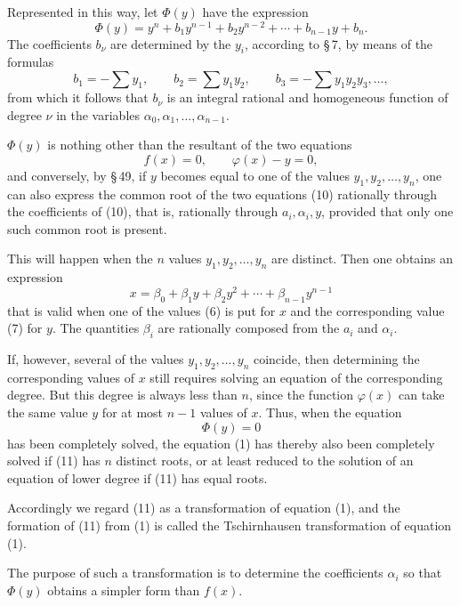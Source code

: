 \documentclass[11pt]{article}
\begin{document}
Represented in this way, let $\Phi(y)$ have the expression
\begin{equation}
\Phi(y)=y^n+b_1y^{n-1}+b_2y^{n-2}+\cdots+b_{n-1}y+b_n.
\tag{9}
\end{equation}
The coefficients $b_\nu$ are determined by the $y_i$, according to \S\,7, by means of the formulas
\[
b_1=-\sum y_1,
\qquad
b_2=\sum y_1y_2,
\qquad
b_3=-\sum y_1y_2y_3,\ldots,
\]
from which it follows that $b_\nu$ is an integral rational and homogeneous function of degree $\nu$ in the variables $\alpha_0,\alpha_1,\ldots,\alpha_{n-1}$.

$\Phi(y)$ is nothing other than the resultant of the two equations
\begin{equation}
f(x)=0,
\qquad
\varphi(x)-y=0,
\tag{10}
\end{equation}
and conversely, by \S\,49, if $y$ becomes equal to one of the values $y_1,y_2,\ldots,y_n$, one can also express the common root of the two equations (10) rationally through the coefficients of (10), that is, rationally through $a_i,\alpha_i,y$, provided that only one such common root is present.

This will happen when the $n$ values $y_1,y_2,\ldots,y_n$ are distinct. Then one obtains an expression
\[
x=\beta_0+\beta_1y+\beta_2y^2+\cdots+\beta_{n-1}y^{n-1}
\]
that is valid when one of the values (6) is put for $x$ and the corresponding value (7) for $y$. The quantities $\beta_i$ are rationally composed from the $a_i$ and $\alpha_i$.

If, however, several of the values $y_1,y_2,\ldots,y_n$ coincide, then determining the corresponding values of $x$ still requires solving an equation of the corresponding degree. But this degree is always less than $n$, since the function $\varphi(x)$ can take the same value $y$ for at most $n-1$ values of $x$. Thus, when the equation
\begin{equation}
\Phi(y)=0
\tag{11}
\end{equation}
has been completely solved, the equation (1) has thereby also been completely solved if (11) has $n$ distinct roots, or at least reduced to the solution of an equation of lower degree if (11) has equal roots.

Accordingly we regard (11) as a transformation of equation (1), and the formation of (11) from (1) is called the Tschirnhausen transformation of equation (1).

The purpose of such a transformation is to determine the coefficients $\alpha_i$ so that $\Phi(y)$ obtains a simpler form than $f(x)$.
\end{document}
